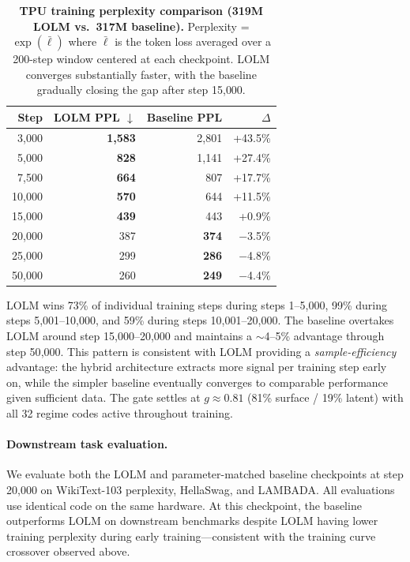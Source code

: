 \documentclass{article}
\begin{document}
\begin{table}[t]
\centering
\caption{\textbf{TPU training perplexity comparison (319M LOLM vs.\ 317M
baseline).} Perplexity = $\exp(\bar{\ell})$ where $\bar{\ell}$ is the
token loss averaged over a 200-step window centered at each checkpoint.
LOLM converges substantially faster, with the baseline gradually closing
the gap after step 15{,}000.}
\label{tab:tpu_comparison}
\vspace{0.5em}
\begin{tabular}{rrrr}
\toprule
\textbf{Step} & \textbf{LOLM PPL} $\downarrow$ & \textbf{Baseline PPL} & \textbf{$\Delta$} \\
\midrule
3{,}000 & \textbf{1{,}583} & 2{,}801 & +43.5\% \\
5{,}000 & \textbf{828} & 1{,}141 & +27.4\% \\
7{,}500 & \textbf{664} & 807 & +17.7\% \\
10{,}000 & \textbf{570} & 644 & +11.5\% \\
15{,}000 & \textbf{439} & 443 & +0.9\% \\
20{,}000 & 387 & \textbf{374} & $-$3.5\% \\
25{,}000 & 299 & \textbf{286} & $-$4.8\% \\
50{,}000 & 260 & \textbf{249} & $-$4.4\% \\
\bottomrule
\end{tabular}
\end{table}

LOLM wins 73\% of individual training steps during steps 1--5{,}000, 99\% during
steps 5{,}001--10{,}000, and 59\% during steps 10{,}001--20{,}000. The baseline
overtakes LOLM around step 15{,}000--20{,}000 and maintains a ${\sim}$4--5\%
advantage through step 50{,}000. This pattern is consistent with LOLM providing a
\emph{sample-efficiency} advantage: the hybrid architecture extracts more signal
per training step early on, while the simpler baseline eventually converges to
comparable performance given sufficient data. The gate settles at $g \approx 0.81$
(81\% surface / 19\% latent) with all 32 regime codes active throughout training.

\paragraph{Downstream task evaluation.}
We evaluate both the LOLM and parameter-matched baseline checkpoints at step
20{,}000 on WikiText-103 perplexity, HellaSwag, and LAMBADA. All evaluations
use identical code on the same hardware. At this checkpoint, the baseline
outperforms LOLM on downstream benchmarks despite LOLM having lower
training perplexity during early training---consistent with the training
curve crossover observed above.
\end{document}
